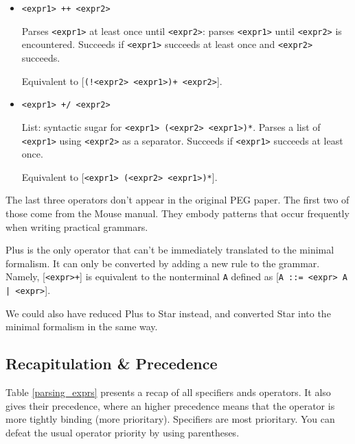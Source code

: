 \begin{itemize}
\item \lstinline{<expr1> ++ <expr2>}

  Parses \texttt{<expr1>} at least once until \texttt{<expr2>}: parses
  \texttt{<expr1>} until \texttt{<expr2>} is encountered. Succeeds if
  \texttt{<expr1>} succeeds at least once and \texttt{<expr2>} succeeds.

  Equivalent to [\lstinline{(!<expr2> <expr1>)+ <expr2>}].

\item \lstinline{<expr1> +/ <expr2>}

  List: syntactic sugar for \lstinline{<expr1> (<expr2> <expr1>)*}. Parses a
  list of \texttt{<expr1>} using \texttt{<expr2>} as a separator. Succeeds if
  \texttt{<expr1>} succeeds at least once.

  Equivalent to [\lstinline{<expr1> (<expr2> <expr1>)*}].

\end{itemize}

The last three operators don't appear in the original PEG paper. The first two
of those come from the Mouse manual. \cite{mouse_man} They embody patterns that
occur frequently when writing practical grammars.

Plus is the only operator that can't be immediately translated to the minimal
formalism. It can only be converted by adding a new rule to the grammar. Namely,
[\lstinline{<expr>+}] is equivalent to the nonterminal \lstinline{A} defined as
[\lstinline{A ::= <expr> A | <expr>}].

We could also have reduced Plus to Star instead, and converted Star into the
minimal formalism in the same way.

\subsection{Recapitulation \& Precedence}

Table \ref{parsing_exprs} presents a recap of all specifiers ands operators. It
also gives their precedence, where an higher precedence means that the operator
is more tightly binding (more prioritary). Specifiers are most prioritary. You
can defeat the usual operator priority by using parentheses.

